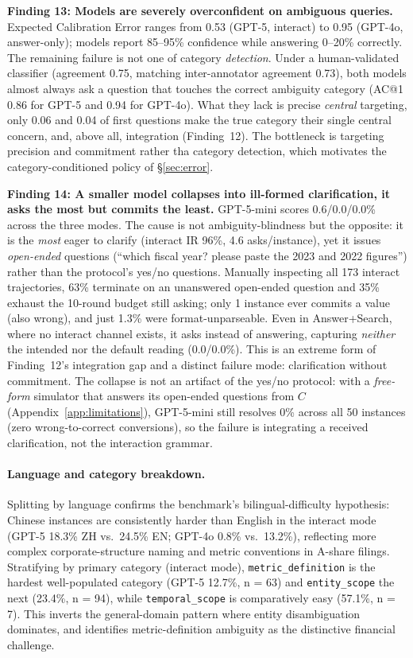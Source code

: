 \textbf{Finding 13: Models are severely overconfident on ambiguous queries.}
Expected Calibration Error ranges from 0.53 (GPT-5, interact) to 0.95 (GPT-4o,
answer-only); models report 85--95\% confidence while answering 0--20\%
correctly. The remaining failure is not one of category \emph{detection}. Under a
human-validated classifier (agreement 0.75, matching inter-annotator agreement 0.73),
both models almost always ask a question that touches the correct ambiguity category (AC@1
0.86 for GPT-5 and 0.94 for GPT-4o). What they lack is precise \emph{central} targeting,
only 0.06 and 0.04 of first questions make the true category their single central concern,
and, above all, integration (Finding~12). The bottleneck is targeting precision and
commitment rather tha category detection, which motivates the category-conditioned policy of
\S\ref{sec:error}.

\textbf{Finding 14: A smaller model collapses into ill-formed clarification, 
it asks the most but commits the least.} GPT-5-mini scores 0.6/0.0/0.0\% across
the three modes. The cause is not ambiguity-blindness but the opposite: it is the
\emph{most} eager to clarify (interact IR 96\%, 4.6 asks/instance), yet it
issues \emph{open-ended} questions (``which fiscal year? please paste the 2023 and
2022 figures'') rather than the protocol's yes/no questions. Manually inspecting
all 173 interact trajectories, 63\% terminate on an unanswered open-ended
question and 35\% exhaust the 10-round budget still asking; only 1 instance
ever commits a value (also wrong), and just 1.3\% were format-unparseable. Even
in Answer+Search, where no interact channel exists, it asks instead of
answering, capturing \emph{neither} the intended nor the default reading
(0.0/0.0\%). This is an extreme form of Finding~12's integration gap and a
distinct failure mode: clarification without commitment. The collapse is not an
artifact of the yes/no protocol: with a \emph{free-form} simulator that answers its
open-ended questions from $C$ (Appendix~\ref{app:limitations}), GPT-5-mini still resolves
0\% across all 50 instances (zero wrong-to-correct conversions), so the failure
is integrating a received clarification, not the interaction grammar.

\paragraph{Language and category breakdown.} Splitting by language confirms the
benchmark's bilingual-difficulty hypothesis: Chinese instances are consistently
harder than English in the interact mode (GPT-5 18.3\% ZH vs.\ 24.5\% EN;
GPT-4o 0.8\% vs.\ 13.2\%), reflecting more complex corporate-structure naming
and metric conventions in A-share filings. Stratifying by primary category (interact
mode), \texttt{metric\_definition} is the hardest well-populated category (GPT-5
12.7\%, n = 63) and \texttt{entity\_scope} the next (23.4\%, n = 94),
while \texttt{temporal\_scope} is comparatively easy (57.1\%, n = 7). This
inverts the general-domain pattern where entity disambiguation dominates, and
identifies metric-definition ambiguity as the distinctive financial challenge.

